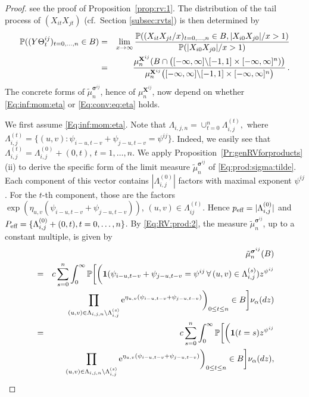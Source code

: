 \begin{proof}
\eeam
 see the proof of 
Proposition~\ref{prop:rv:1}. The distribution of the tail process of $(X_{it}X_{jt})$ (cf.\ Section \ref{subsec:rvts}) is then determined by
\begin{eqnarray}\label{Eq:theta:law} {\mathbb P}((Y \Theta^{ij}_t)_{t=0, \ldots, n} \in B)&=&\lim_{x \to \infty} \frac{{\mathbb P}((X_{it}X_{jt}/x)_{t=0, \ldots, n} \in B, |X_{i0}X_{j0}|/x>1)}{{\mathbb P}(|X_{i0}X_{j0}|/x>1)}\\
\nonumber &=&\frac{\mu_n^{{\bf X}^{ij}}(B \cap \big([-\infty,\infty]\backslash [-1,1]\times 
[-\infty,\infty]^n)\big)}{\mu_n^{{\bf X}^{ij}}\big([-\infty,\infty]\backslash [-1,1]\times [-\infty,\infty]^n\big)}\,.
\end{eqnarray}
The concrete forms of $\tilde{\mu}_n^{\boldsymbol{\sigma}^{ij}}$, hence of $\mu_n^{\mathbf{X}^{ij}}$, 
now depend on whether \eqref{Eq:inf:mom:eta} or \eqref{Eq:conv:eq:eta} holds.
\par
We first assume \eqref{Eq:inf:mom:eta}. Note that
$\Lambda_{i,j,n}=\cup_{t=0}^n \Lambda_{i,j}^{(t)},$ where $\Lambda_{i,j}^{(t)}=\{(u,v): \psi_{i-u,t-v}+\psi_{j-u,t-v}=\psi^{ij}\}$. Indeed, 
we easily see that $\Lambda_{i,j}^{(t)}=\Lambda_{i,j}^{(0)}+(0,t)$, $t=1, \ldots, n$. 
We apply Proposition~\ref{Pr:genRVforproducts}(ii) 
to derive the specific form of the limit measure $\tilde{\mu}_n^{\boldsymbol{\sigma}^{ij}}$ of \eqref{Eq:prod:sigma:tilde}. 
Each component of this vector contains $|\Lambda_{i,j}^{(0)}|$ factors 
with maximal exponent $\psi^{ij}$. For the $t$-th component, those are the factors 
$\exp(\eta_{u,v}(\psi_{i-u,t-v}+\psi_{j-u,t-v}))$, $(u,v) \in \Lambda_{ij}^{(t)}$. Hence $p_{\mbox{\scriptsize eff}}=|\Lambda_{i,j}^{(0)}|$ and 
$P_{\mbox{\scriptsize eff}}=\{\Lambda_{i,j}^{(0)}+(0,t), t=0, \ldots, n\}$. By \eqref{Eq:RV:prod:2}, 
the measure $\tilde{\mu}^{\boldsymbol{\sigma}^{ij}}_n$, up to a constant multiple, is given by
\begin{eqnarray*}
 && \tilde{\mu}^{\boldsymbol{\sigma}^{ij}}_n(B) \\
 &=& c \sum_{s=0}^n \int_0^\infty \P\bigg[\bigg(\I(\psi_{i-u,t-v}+\psi_{j-u,t-v}=\psi^{ij} \, \forall\, (u,v) \in \Lambda_{i,j}^{(s)})z^{\psi^{ij}}\\
 && \prod_{(u,v) \in \Lambda_{i,j,n} \setminus \Lambda_{i,j}^{(s)}}\ex^{\eta_{u,v}(\psi_{i-u,t-v}+\psi_{j-u,t-v})}\bigg)_{0 \leq t \leq n} \in B\bigg]\nu_{\alpha}(dz)\\
 &=& c \sum_{s=0}^n \int_0^\infty \P\bigg[\bigg(\I(t=s)z^{\psi^{ij}} \\
 && \prod_{(u,v) \in \Lambda_{i,j,n} \setminus \Lambda_{i,j}^{(s)}}\ex^{\eta_{u,v}(\psi_{i-u,t-v}+\psi_{j-u,t-v})}\bigg)_{0 \leq t \leq n} \in B\bigg]\nu_{\alpha}(dz),

\end{eqnarray*}
\end{proof}
